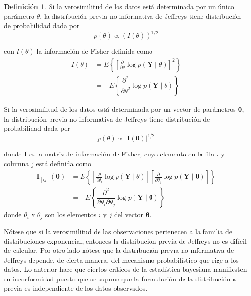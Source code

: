 \documentclass[
  10pt,
  spanish,
]{book}
\theoremstyle{definition}
\newtheorem{definition}{Definición}[chapter]
\theoremstyle{definition}
\theoremstyle{definition}
\theoremstyle{definition}
\theoremstyle{remark}
\begin{document}
\begin{definition}
\protect\hypertarget{def:Jeffreys}{}{\label{def:Jeffreys} }Si la verosimilitud de los datos está determinada por un único parámetro \(\theta\), la distribución previa no informativa de Jeffreys tiene distribución de probabilidad dada por
\begin{equation}
p(\theta)\propto (I(\theta))^{1/2}
\end{equation}

con \(I(\theta)\) la información de Fisher definida como
\begin{align*}
I(\theta)&=E\left\{\left[\frac{\partial}{\partial\theta}\log{p(\mathbf{Y}\mid\theta)}\right]^2\right\}\\
&=-E\left\{\dfrac{\partial^2}{\partial\theta^2}\log{p(\mathbf{Y}\mid\theta)}\right\}
\end{align*}

Si la verosimilitud de los datos está determinada por un vector de parámetros \(\boldsymbol \theta\), la distribución previa no informativa de Jeffreys tiene distribución de probabilidad dada por
\begin{equation}
p(\theta)\propto |\mathbf{I}(\boldsymbol \theta)|^{1/2}
\end{equation}

donde \(\mathbf{I}\) es la matriz de información de Fisher, cuyo elemento en la fila \(i\) y columna \(j\) está definida como
\begin{align*}
\mathbf{I}_{[ij]}(\boldsymbol \theta)&=E\left\{\left[\frac{\partial}{\partial\theta_i}\log{p(\mathbf{Y}\mid\theta)}\right]\left[\frac{\partial}{\partial\theta_j}\log{p(\mathbf{Y}\mid\boldsymbol \theta)}\right]\right\}\\
&=-E\left\{\dfrac{\partial^2}{\partial\theta_i\partial\theta_j}\log{p(\mathbf{Y}\mid\boldsymbol \theta)}\right\}
\end{align*}
donde \(\theta_i\) y \(\theta_j\) son los elementos \(i\) y \(j\) del vector \(\boldsymbol \theta\).
\end{definition}

Nótese que si la verosimilitud de las observaciones pertenecen a la
familia de distribuciones exponencial, entonces la distribución previa
de Jeffreys no es difícil de calcular. Por otro lado nótese que la
distribución previa no informativa de Jeffreys depende, de cierta
manera, del mecanismo probabilístico que rige a los datos. Lo anterior
hace que ciertos críticos de la estadística bayesiana manifiesten su incorformidad puesto que se supone que la formulación de la distribución a
previa es independiente de los datos observados.
\end{document}
